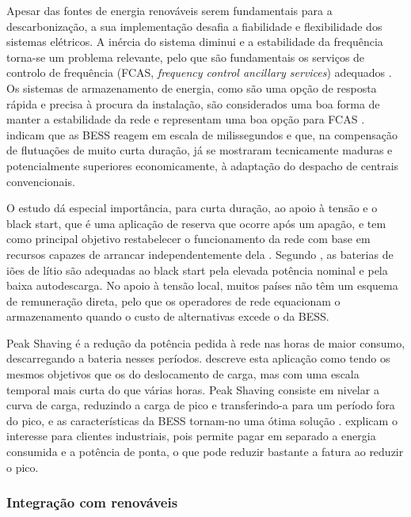 Apesar das fontes de energia renováveis serem fundamentais para a descarbonização, a sua implementação desafia a fiabilidade e flexibilidade dos sistemas elétricos. A inércia do sistema diminui e a estabilidade da frequência torna-se um problema relevante, pelo que são fundamentais os serviços de controlo de frequência (FCAS, \textit{frequency control ancillary services}) adequados \cite{Garttan2025}. 
Os sistemas de armazenamento de energia, como são uma opção de resposta rápida e precisa à procura da instalação, são considerados uma boa forma de manter a estabilidade da rede e representam uma boa opção para FCAS \cite{Garttan2025}. \textcite{ Hesse2017} indicam que as BESS reagem em escala de milissegundos e que, na compensação de flutuações de muito curta duração, já se mostraram tecnicamente maduras e potencialmente superiores economicamente, à adaptação do despacho de centrais convencionais.

O estudo \textcite{Zhao2023} dá especial importância, para curta duração, ao apoio à tensão e o black start, que é uma aplicação de reserva que ocorre após um apagão, e tem como principal objetivo restabelecer o funcionamento da rede com base em recursos capazes de arrancar independentemente dela \cite{ Zhao2023}. Segundo \textcite{ Hesse2017}, as baterias de iões de lítio são adequadas ao black start pela elevada potência nominal e pela baixa autodescarga. No apoio à tensão local, muitos países não têm um esquema de remuneração direta, pelo que os operadores de rede equacionam o armazenamento quando o custo de alternativas excede o da BESS.




Peak Shaving é a redução da potência pedida à rede nas horas de maior consumo, descarregando a bateria nesses períodos. \textcite{ Aimone2018} descreve esta aplicação como tendo os mesmos objetivos que os do deslocamento de carga, mas com uma escala temporal mais curta do que várias horas.  Peak Shaving consiste em nivelar a curva de carga, reduzindo a carga de pico e transferindo-a para um período fora do pico, e as características da BESS tornam-no uma ótima solução \cite{ Prakash2022}. \textcite{ Hesse2017} explicam o interesse para clientes industriais, pois permite pagar em separado a energia consumida e a potência de ponta, o que pode reduzir bastante a fatura ao reduzir o pico. 

\subsubsection{Integração com renováveis }
\label{sec:Ch2.1.6.4}

